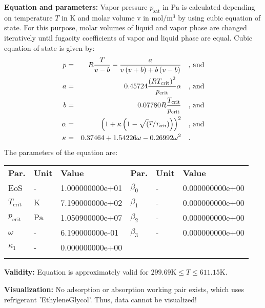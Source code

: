 \textbf{Equation and parameters:}
\newline
%
Vapor pressure $p_\mathrm{sat}$ in $\si{\pascal}$ is calculated depending on temperature $T$ in $\si{\kelvin}$ and molar volume v in $\si{\mole\per\cubic\meter}$ by using cubic equation of state. For this purpose, molar volumes of liquid and vapor phase are changed iteratively until fugacity coefficients of vapor and liquid phase are equal. Cubic equation of state is given by:
\begin{equation*}
\begin{split}
p &=& R \frac{T}{v - b} - \frac{a}{v \left(v + b\right) + b \left(v - b\right)} & \quad\text{, and} \\
a &=& 0.45724 \frac{\left(R T_\mathrm{crit} \right)^2}{p_\mathrm{crit}} \alpha & \quad\text{, and} \\
b &=& 0.07780 R \frac{T_\mathrm{crit}}{p_\mathrm{crit}} & \quad\text{, and} \\
\alpha &=& \left(1 + \kappa \left(1 - \sqrt(\nicefrac{T}{T_\mathrm{crit}}) \right) \right)^2 & \quad\text{, and} \\
\kappa &=& 0.37464 + 1.54226 \omega - 0.26992 \omega^2 & \quad\text{.}
\end{split}
\end{equation*}
%
The parameters of the equation are:
%
\begin{longtable}[l]{lll|lll}
\toprule
\addlinespace
\textbf{Par.} & \textbf{Unit} & \textbf{Value} &	\textbf{Par.} & \textbf{Unit} & \textbf{Value} \\
\addlinespace
\midrule
\endhead

\bottomrule
\endfoot
\bottomrule
\endlastfoot
\addlinespace

EoS & - & 1.000000000e+01 & $\beta_0$ & - & 0.000000000e+00 \\
$T_\mathrm{crit}$ & $\si{\kelvin}$ & 7.190000000e+02 & $\beta_1$ & - & 0.000000000e+00 \\
$p_\mathrm{crit}$ & $\si{\pascal}$ & 1.050900000e+07 & $\beta_2$ & - & 0.000000000e+00 \\
$\omega$ & - & 6.190000000e-01 & $\beta_3$ & - & 0.000000000e+00 \\
$\kappa_1$ & - & 0.000000000e+00 & & & \\

\addlinespace\end{longtable}

\textbf{Validity:}
\newline
Equation is approximately valid for $299.69 \si{\kelvin} \leq T \leq 611.15 \si{\kelvin}$.
\newline

\textbf{Visualization:}
%
\newline
No adsorption or absorption working pair exists, which uses refrigerant 'EthyleneGlycol'. Thus, data cannot be visualized!
%

\FloatBarrier
\newpage
